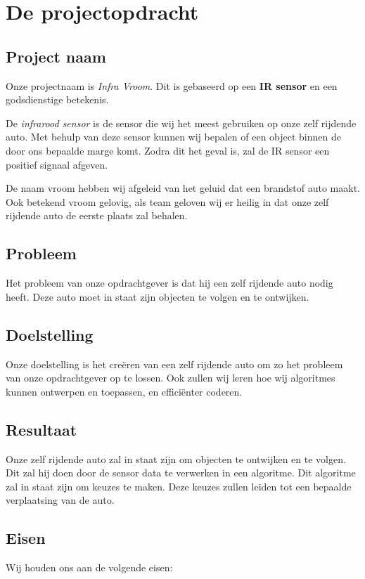 \section{De projectopdracht}
\subsection{Project naam}
Onze projectnaam is \textit{Infra Vroom}. Dit is gebaseerd op een \textbf{IR sensor} en een godsdienstige betekenis.

De \textit{infrarood sensor} is de sensor die wij het meest gebruiken op onze zelf rijdende auto. Met behulp van deze sensor kunnen wij bepalen of  een object binnen de door ons bepaalde marge komt. Zodra dit het geval is, zal de IR sensor een positief signaal afgeven.

De naam vroom hebben wij afgeleid van het geluid dat een brandstof auto maakt. Ook betekend vroom gelovig, als team geloven wij er heilig in dat onze zelf rijdende auto de eerste plaats zal behalen.

\subsection{Probleem}
Het probleem van onze opdrachtgever is dat hij een zelf rijdende auto nodig heeft. Deze auto moet in staat zijn objecten te volgen en te ontwijken.

\subsection{Doelstelling}
Onze doelstelling is het creëren van een zelf rijdende auto om zo het probleem van onze opdrachtgever op te lossen. Ook zullen wij leren hoe wij algoritmes kunnen ontwerpen en toepassen, en efficiënter coderen.

\subsection{Resultaat}
Onze zelf rijdende auto zal in staat zijn om objecten te ontwijken en te volgen. Dit zal hij doen door de sensor data te verwerken in een algoritme. Dit algoritme zal in staat zijn om keuzes te maken. Deze keuzes zullen leiden tot een bepaalde verplaatsing van de auto.

\subsection{Eisen}
Wij houden ons aan de volgende eisen:

